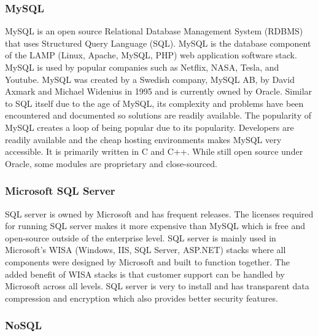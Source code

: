 \documentclass[12pt]{report}
\begin{document}
\subsubsection*{MySQL}

MySQL is an open source Relational Database Management System (RDBMS) that uses Structured Query Language (SQL).  MySQL is the database component of the LAMP (Linux, Apache, MySQL, PHP) web application software stack.  MySQL is used by popular companies such as Netflix, NASA, Tesla, and Youtube.  MySQL was created by a Swedish company, MySQL AB, by David Axmark and Michael Widenius in 1995 and is currently owned by Oracle.  Similar to SQL itself due to the age of MySQL, its complexity and problems have been encountered and documented so solutions are readily available.  The popularity of MySQL creates a loop of being popular due to its popularity.  Developers are readily available and the cheap hosting environments makes MySQL very accessible.  It is primarily written in C and C++.  While still open source under Oracle, some modules are proprietary and close-sourced.  

\subsubsection*{Microsoft SQL Server}

SQL server is owned by Microsoft and has frequent releases.  The licenses required for running SQL server makes it more expensive than MySQL which is free and open-source outside of the enterprise level.  SQL server is mainly used in Microsoft’s WISA (Windows, IIS, SQL Server, ASP.NET) stacks where all components were designed by Microsoft and built to function together.  The added benefit of WISA stacks is that customer support can be handled by Microsoft across all levels.  SQL server is very to install and has transparent data compression and encryption which also provides better security features. 

\subsubsection*{NoSQL}
\end{document}
